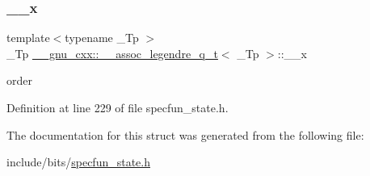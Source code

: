 \subsubsection{\texorpdfstring{\+\_\+\+\_\+x}{\_\_x}}
{\footnotesize\ttfamily template$<$typename \+\_\+\+Tp $>$ \\
\+\_\+\+Tp \hyperlink{struct____gnu__cxx_1_1____assoc__legendre__q__t}{\+\_\+\+\_\+gnu\+\_\+cxx\+::\+\_\+\+\_\+assoc\+\_\+legendre\+\_\+q\+\_\+t}$<$ \+\_\+\+Tp $>$\+::\+\_\+\+\_\+x}



order 



Definition at line 229 of file specfun\+\_\+state.\+h.



The documentation for this struct was generated from the following file\+:\begin{DoxyCompactItemize}
\item 
include/bits/\hyperlink{specfun__state_8h}{specfun\+\_\+state.\+h}\end{DoxyCompactItemize}
